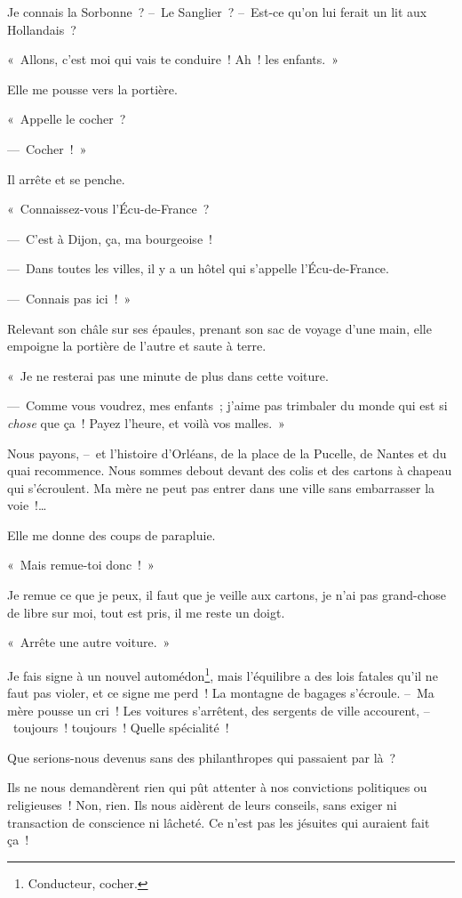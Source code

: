 \documentclass[french,twoside]{book} %
\begin{document}
Je connais la Sorbonne ? – Le Sanglier ? – Est-ce qu’on lui ferait un lit aux Hollandais ?\par
« Allons, c’est moi qui vais te conduire ! Ah ! les enfants. »\par
Elle me pousse vers la portière.\par
« Appelle le cocher ?\par
— Cocher ! »\par
Il arrête et se penche.\par
« Connaissez-vous l’Écu-de-France ?\par
— C’est à Dijon, ça, ma bourgeoise !\par
— Dans toutes les villes, il y a un hôtel qui s’appelle l’Écu-de-France.\par
— Connais pas ici ! »\par
Relevant son châle sur ses épaules, prenant son sac de voyage d’une main, elle empoigne la portière de l’autre et saute à terre.\par
« Je ne resterai pas une minute de plus dans cette voiture.\par
— Comme vous voudrez, mes enfants ; j’aime pas trimbaler du monde qui est si \emph{chose} que ça ! Payez l’heure, et voilà vos malles. »\par
Nous payons, – et l’histoire d’Orléans, de la place de la Pucelle, de Nantes et du quai recommence. Nous sommes debout devant des colis et des cartons à chapeau qui s’écroulent. Ma mère ne peut pas entrer dans une ville sans embarrasser la voie !…\par
Elle me donne des coups de parapluie.\par
« Mais remue-toi donc ! »\par
Je remue ce que je peux, il faut que je veille aux cartons, je n’ai pas grand-chose de libre sur moi, tout est pris, il me reste un doigt.\par
« Arrête une autre voiture. »\par
Je fais signe à un nouvel automédon\footnote{Conducteur, cocher.}, mais l’équilibre a des lois fatales qu’il ne faut pas violer, et ce signe me perd ! La montagne de bagages s’écroule. – Ma mère pousse un cri ! Les voitures s’arrêtent, des sergents de ville accourent, – toujours ! toujours ! Quelle spécialité !\par
\bigbreak
\noindent Que serions-nous devenus sans des philanthropes qui passaient par là ?\par
Ils ne nous demandèrent rien qui pût attenter à nos convictions politiques ou religieuses ! Non, rien. Ils nous aidèrent de leurs conseils, sans exiger ni transaction de conscience ni lâcheté. Ce n’est pas les jésuites qui auraient fait ça !\par
\end{document}
